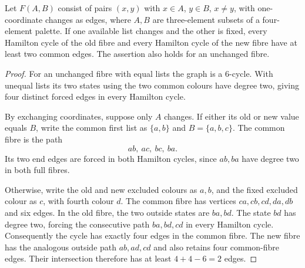 
\begin{lemma}
Let $F(A,B)$ consist of pairs $(x,y)$ with $x\in A$, $y\in B$, $x\ne y$,
with one-coordinate changes as edges, where $A,B$ are three-element
subsets of a four-element palette. If one available list changes and
the other is fixed, every Hamilton cycle of the old fibre and every
Hamilton cycle of the new fibre have at least two common edges.
The assertion also holds for an unchanged fibre.
\end{lemma}
\begin{proof}
For an unchanged fibre with equal lists the graph is a $6$-cycle.
With unequal lists its two states using the two common colours have
degree two, giving four distinct forced edges in every Hamilton cycle.

By exchanging coordinates, suppose only $A$ changes. If either its
old or new value equals $B$, write the common first list as $\{a,b\}$
and $B=\{a,b,c\}$. The common fibre is the path
\[
ab,\ ac,\ bc,\ ba.
\]
Its two end edges are forced in both Hamilton cycles, since $ab,ba$
have degree two in both full fibres.

Otherwise, write the old and new excluded colours as $a,b$, and
the fixed excluded colour as $c$, with fourth colour $d$. The common
fibre has vertices $ca,cb,cd,da,db$ and six edges. In the old fibre,
the two outside states are $ba,bd$. The state $bd$ has degree two,
forcing the consecutive path $ba,bd,cd$ in every Hamilton cycle.
Consequently the cycle has exactly four edges in the common fibre.
The new fibre has the analogous outside path $ab,ad,cd$ and also
retains four common-fibre edges. Their intersection therefore has
at least $4+4-6=2$ edges.
\end{proof}


